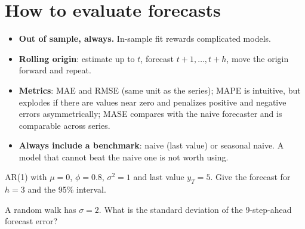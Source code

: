\section{How to evaluate forecasts}
\begin{itemize}[leftmargin=1.4em]
\item \textbf{Out of sample, always.} In-sample fit rewards complicated models.
\item \textbf{Rolling origin}: estimate up to $t$, forecast $t+1,\dots,t+h$, move the origin forward and repeat.
\item \textbf{Metrics}: MAE and RMSE (same unit as the series); MAPE is intuitive, but explodes if there are values near zero and penalizes positive and negative errors asymmetrically; MASE compares with the naive forecaster and is comparable across series.
\item \textbf{Always include a benchmark}: naive (last value) or seasonal naive. A model that cannot beat the naive one is not worth using.
\end{itemize}

\begin{exercicio}
AR(1) with $\mu=0$, $\phi=0.8$, $\sigma^2=1$ and last value $y_T=5$. Give the forecast for $h=3$ and the 95\% interval.
\end{exercicio}

\begin{exercicio}
A random walk has $\sigma=2$. What is the standard deviation of the 9-step-ahead forecast error?
\end{exercicio}
